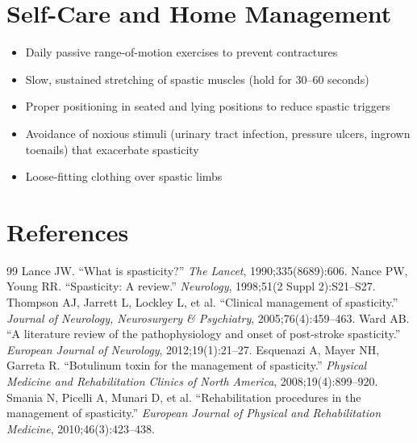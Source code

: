 \section*{Self-Care and Home Management}
\begin{itemize}
  \item Daily passive range-of-motion exercises to prevent contractures
  \item Slow, sustained stretching of spastic muscles (hold for 30--60 seconds)
  \item Proper positioning in seated and lying positions to reduce spastic triggers
  \item Avoidance of noxious stimuli (urinary tract infection, pressure ulcers, ingrown toenails) that exacerbate spasticity
  \item Loose-fitting clothing over spastic limbs
\end{itemize}

\section*{References}
\begin{thebibliography}{99}
 Lance JW. ``What is spasticity?'' \textit{The Lancet}, 1990;335(8689):606.
 Nance PW, Young RR. ``Spasticity: A review.'' \textit{Neurology}, 1998;51(2 Suppl 2):S21--S27.
 Thompson AJ, Jarrett L, Lockley L, et al. ``Clinical management of spasticity.'' \textit{Journal of Neurology, Neurosurgery \& Psychiatry}, 2005;76(4):459--463.
 Ward AB. ``A literature review of the pathophysiology and onset of post-stroke spasticity.'' \textit{European Journal of Neurology}, 2012;19(1):21--27.
 Esquenazi A, Mayer NH, Garreta R. ``Botulinum toxin for the management of spasticity.'' \textit{Physical Medicine and Rehabilitation Clinics of North America}, 2008;19(4):899--920.
 Smania N, Picelli A, Munari D, et al. ``Rehabilitation procedures in the management of spasticity.'' \textit{European Journal of Physical and Rehabilitation Medicine}, 2010;46(3):423--438.
\end{thebibliography}
